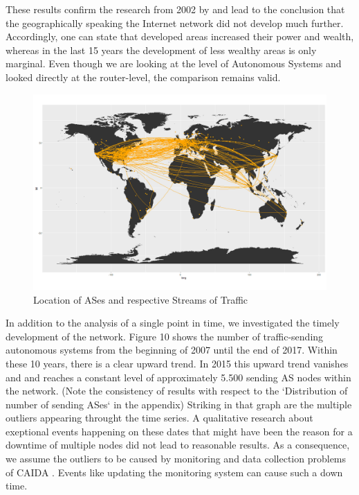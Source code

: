 \documentclass[conference, 11pt]{IEEEtran}
\begin{document}
These results confirm the research from 2002 by \cite{geoResearch} and lead to the conclusion that the geographically speaking the Internet network did not develop much further. Accordingly, one can state that developed areas increased their power and wealth, whereas in the last 15 years the development of less wealthy areas is only marginal. Even though we are looking at the level of Autonomous Systems and \cite{geoResearch} looked directly at the router-level, the comparison remains valid. \\


\vspace{0.5cm}
\begin{figure}[htbp]
\centerline{\includegraphics[scale=0.2]{Graphics/connectedASes.png}}
\caption{Location of ASes and respective Streams of Traffic}
\label{fig}
\end{figure}
\vspace{0.5cm}

In addition to the analysis of a single point in time, we investigated the timely development of the network. Figure 10 shows the number of traffic-sending autonomous systems from the beginning of 2007 until the end of 2017. Within these 10 years, there is a clear upward trend. In 2015 this upward trend vanishes and and reaches a constant level of approximately 5.500 sending AS nodes within the network. (Note the consistency of results with respect to  the `Distribution of number of sending ASes` in the appendix) Striking in that graph are the multiple outliers appearing throught the time series. A qualitative research about exeptional events happening on these dates that might have been the reason for a downtime of multiple nodes did not lead to reasonable results. As a consequence, we assume the outliers to be caused by monitoring and data collection problems of CAIDA \cite{CaidaDataCollection}. Events like updating the monitoring system can cause such a down time. 
\end{document}
